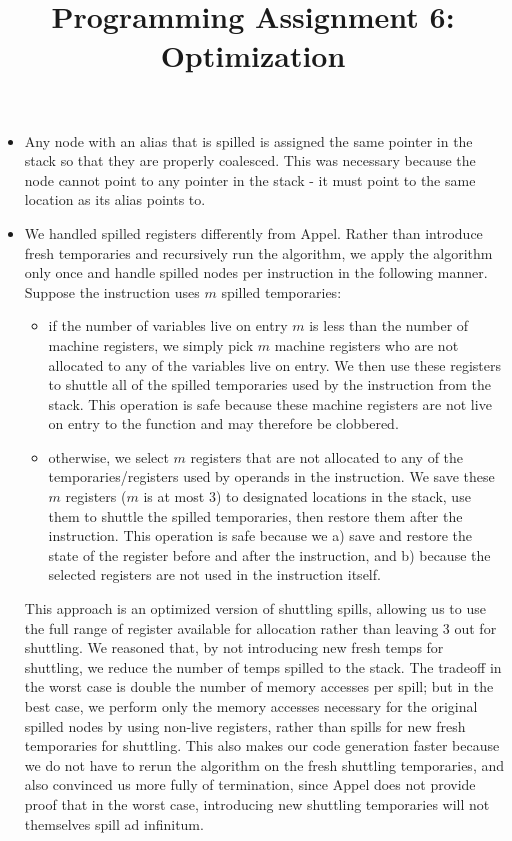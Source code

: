 \documentclass{hw} \title{Programming Assignment 6:\\ Optimization}
\begin{document}
  \begin{itemize}
    \item Any node with an alias that is spilled is assigned the same pointer
      in the stack so that they are properly coalesced. This was necessary
      because the node cannot point to any pointer in the stack - it must point
      to the same location as its alias points to.

    \item We handled spilled registers differently from Appel. Rather than
      introduce fresh temporaries and recursively run the algorithm, we apply
      the algorithm only once and handle spilled nodes per instruction in the
      following manner. Suppose the instruction uses $m$ spilled temporaries:
      \begin{itemize}
        \item if the number of variables live on entry $m$ is less than the
          number of machine registers, we simply pick $m$ machine registers
          who are not allocated to any of the variables live on entry. We then
          use these registers to shuttle all of the spilled temporaries used
          by the instruction from the stack. This operation is safe because
          these machine registers are not live on entry to the function and
          may therefore be clobbered.

        \item otherwise, we select $m$ registers that are not allocated to
          any of the temporaries/registers used by operands in the instruction.
          We save these $m$ registers ($m$ is at most 3) to designated locations
          in the stack, use them to shuttle the spilled temporaries, then restore
          them after the instruction. This operation is safe because we a) save
          and restore the state of the register before and after the instruction,
          and b) because the selected registers are not used in the instruction
          itself.
      \end{itemize}

      This approach is an optimized version of shuttling spills, allowing us to
      use the full range of register available for allocation rather than leaving
      3 out for shuttling. We reasoned that, by not introducing new fresh temps
      for shuttling, we reduce the number of temps spilled to the stack. The
      tradeoff in the worst case is double the number of memory accesses per spill;
      but in the best case, we perform only the memory accesses necessary for the
      original spilled nodes by using non-live registers, rather than spills for
      new fresh temporaries for shuttling. This also makes our code generation faster
      because we do not have to rerun the algorithm on the fresh shuttling temporaries,
      and also convinced us more fully of termination, since Appel does not provide
      proof that in the worst case, introducing new shuttling temporaries will not
      themselves spill ad infinitum.
  \end{itemize}
\end{document}
